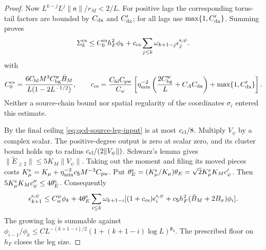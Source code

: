 \documentclass[11pt,letterpaper,reqno]{amsart}
\theoremstyle{definition}
\theoremstyle{remark}
\begin{document}
\begin{proof}
Now $L^{k-j}L^j\|\mathsf n\|/r_M<2/L$. For positive lags
the corresponding torus-tail factors are bounded by
$C_{\rm dx}$ and $C'_{\rm dx}$; for all lags use
$\max\{1,C'_{\rm dx}\}$. Summing proves
\begin{equation}\label{eq:qcd-source-cell-sum}
 \Sigma_k^{\rm cs}\le C_0^{\rm cs}h_F^2\phi_k+
 c_{\rm cs}\sum_{j\le k}\omega_{k+1-j}
                                  \epsilon_j^{{\rm s},\psi}.
\end{equation}
with
\[
 C_0^{\rm cs}=\frac{6C_{\rm hl}M^3C_{\rm bg}^{\rm w}\bar B_M}
                         {L(1-2L^{-1/2})},\qquad
 c_{\rm cs}=\frac{C_{\rm hl}C_{\rm pw}}{C_\omega}
 \left[\eta_{\min}^{-2}
       \left(\frac{2C_{\rm bg}^{\rm w}}L+C_AC_{\rm dx}\right)
          +\max\{1,C'_{\rm dx}\}\right].
\]
Neither a source-chain bound nor spatial regularity of the
coordinates $\sigma_i$ entered this estimate.

By the final ceiling \eqref{eq:qcd-source-leg-input} is at
most $c_{\rm cl}/8$. Multiply $V_\psi$ by a complex scalar.
The positive-degree output is zero at scalar zero, and its
cluster bound holds up to radius
$c_{\rm cl}/(2\|V_\psi\|)$. Schwarz's lemma gives
$\|\widetilde E_{\ge2}\|\le5K_M\|V_\psi\|$.
Taking out the moment and filing its moved pieces costs
$K_\mu^{\rm s}=K_\mu+\eta_{\min}^{-2}c_{\mathsf S}M^{-3}C_{\rm pw}$.
Put $\theta_E^{\rm s}=(K_\mu^{\rm s}/K_\mu)\theta_E
=\sqrt2K_\mu^{\rm s}K_Mc'_\psi$. Then
$5K_\mu^{\rm s}K_Mc''_\psi\le4\theta_E^{\rm s}$.
Consequently
\[
 \epsilon_{k+1}^{{\rm s},\psi}\le C_w^\psi\phi_k+
 4\theta_E^{\rm s}\sum_{i\le k}\omega_{k+1-i}
 [(1+c_{\rm cs})\epsilon_i^{{\rm s},\psi}
       +c_{\mathsf S}h_F^2(\bar B_M+2B_\sigma)\phi_i].
\]
The growing lag is summable against
$\phi_{i-1}/\phi_k\le CL^{-(k+1-i)/2}
(1+(k+1-i)\log L)^{\mathfrak p_0}$.
The prescribed floor on $h_F$ closes the leg size.


\end{proof}
\end{document}
